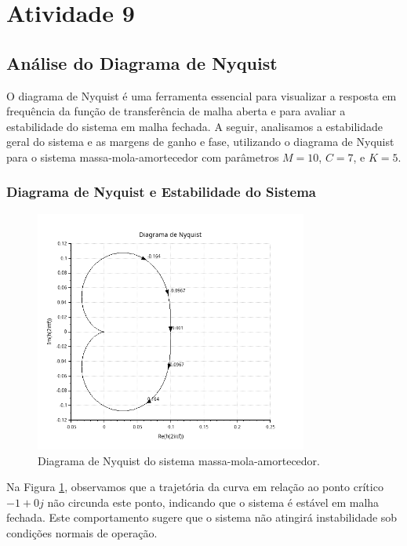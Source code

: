 \section{Atividade 9}

\subsection{Análise do Diagrama de Nyquist}

O diagrama de Nyquist é uma ferramenta essencial para visualizar a resposta em frequência da função de transferência de malha aberta e para avaliar a estabilidade do sistema em malha fechada. A seguir, analisamos a estabilidade geral do sistema e as margens de ganho e fase, utilizando o diagrama de Nyquist para o sistema massa-mola-amortecedor com parâmetros \(M = 10\), \(C = 7\), e \(K = 5\).

\subsubsection{Diagrama de Nyquist e Estabilidade do Sistema}

\begin{figure}[H]
    \centering
    \includegraphics[width=0.8\textwidth]{atividades/9-atividade/assets/nyquist.png}
    \caption{Diagrama de Nyquist do sistema massa-mola-amortecedor.}
    \label{fig:Nyquist1}
\end{figure}

Na Figura \ref{fig:Nyquist1}, observamos que a trajetória da curva em relação ao ponto crítico \(-1 + 0j\) não circunda este ponto, indicando que o sistema é estável em malha fechada. Este comportamento sugere que o sistema não atingirá instabilidade sob condições normais de operação.

